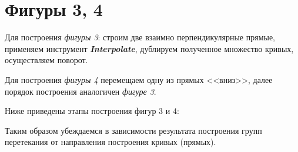 \newpage
\section[Фигуры 3, 4]{Фигуры 3, 4}

Для построения \textit{фигуры 3}: строим две взаимно перпендикулярные прямые, 
применяем инструмент \textit{\textbf{Interpolate}},
дублируем полученное множество кривых, осуществляем поворот.

Для построения \textit{фигуры 4} перемещаем одну из прямых <<вниз>>, далее
порядок построения аналогичен \textit{фигуре 3}.
\vspace{12pt}

Ниже приведены этапы построения фигур 3 и 4:
\begin{figure}[H]
    \begin{minipage}[h]{1\linewidth}
    \end{minipage}
\end{figure}

Таким образом убеждаемся в зависимости результата построения групп перетекания 
от направления построения кривых (прямых).
